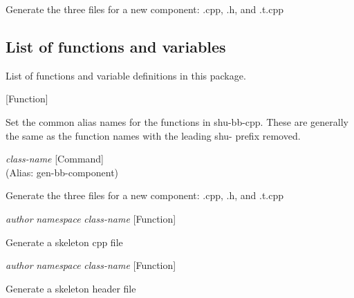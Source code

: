 \begin{doc-string}
Generate the three files for a new component: .cpp, .h, and .t.cpp
\end{doc-string}

\subsection{List of functions and variables}

List of functions and variable definitions in this package.



\vspace{1em}
\noindent
{}
\usebox{\funcname}
 \hfill [Function]

\begin{doc-string}
Set the common alias names for the functions in shu-bb-cpp.
These are generally the same as the function names with the leading
shu- prefix removed.
\end{doc-string}

\vspace{1em}
\noindent
{}
\usebox{\funcname}\emph{class-name}
 \hfill [Command]\\%
 (Alias: gen-bb-component)

\begin{doc-string}
Generate the three files for a new component: .cpp, .h, and .t.cpp
\end{doc-string}

\vspace{1em}
\noindent
{}
\usebox{\funcname}\emph{author} \emph{namespace} \emph{class-name}
 \hfill [Function]

\begin{doc-string}
Generate a skeleton cpp file
\end{doc-string}

\vspace{1em}
\noindent
{}
\usebox{\funcname}\emph{author} \emph{namespace} \emph{class-name}
 \hfill [Function]

\begin{doc-string}
Generate a skeleton header file
\end{doc-string}

